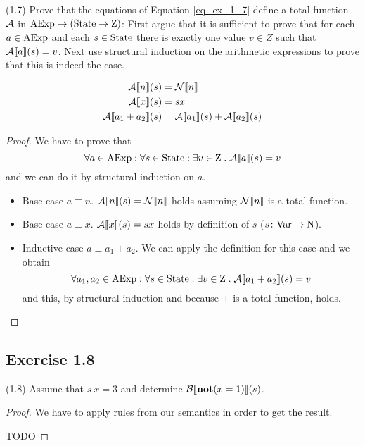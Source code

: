 \documentclass[12pt,a4paper,oneside]{book}
\begin{document}
\begin{exercise}{(1.7)}
	\label{ex_1_7}
	Prove that the equations of Equation \ref{eq_ex_1_7} define a total function $\mathcal{A}$ in $\mathrm{AExp} \to (\mathrm{State} \to \mathrm{Z})$: First argue that it is sufficient to prove that for each $a \in \mathrm{AExp}$ and each $s \in \mathrm{State}$ there is exactly one value $v \in Z$ such that $\mathcal{A} \llbracket a \rrbracket (s) = v$. Next use structural induction on the arithmetic expressions to prove that this is indeed the case.
	
	\begin{equation}
	\label{eq_ex_1_7}
	\begin{split}
	\mathcal{A} \llbracket n \rrbracket (s) &= \mathcal{N} \llbracket n \rrbracket \\
	\mathcal{A} \llbracket x \rrbracket (s) &= s x \\
	\mathcal{A} \llbracket a_1+a_2 \rrbracket (s) &= \mathcal{A} \llbracket a_1 \rrbracket (s) + \mathcal{A} \llbracket a_2 \rrbracket (s) \\
	\end{split}
	\end{equation}
	
	\begin{proof}
		We have to prove that
		\[
		\forall a \in \mathrm{AExp} \mathrel{:} \forall s \in \mathrm{State}: \exists v \in \mathrm{Z} \mathrel{.} \mathcal{A} \llbracket a \rrbracket (s) = v
		\]
		and we can do it by structural induction on $a$.
		
		\begin{itemize}
			\item Base case $a \equiv n$. $\mathcal{A} \llbracket n \rrbracket (s) = \mathcal{N} \llbracket n \rrbracket$ holds assuming $\mathcal{N} \llbracket n \rrbracket$ is a total function.
			\item Base case $a \equiv x$. $\mathcal{A} \llbracket x \rrbracket (s) = s x$ holds by definition of $s$ ($\mathord{s}\colon\mathrm{Var}\to\mathrm{N}$).
			\item Inductive case $a \equiv a_1 + a_2$. We can apply the definition for this case and we obtain
			\[
			\forall a_1, a_2 \in \mathrm{AExp} \mathrel{:} \forall s \in \mathrm{State}: \exists v \in \mathrm{Z} \mathrel{.} \mathcal{A} \llbracket a_1 + a_2 \rrbracket (s) = v
			\]
			and this, by structural induction and because $+$ is a total function, holds.
		\end{itemize}
	\end{proof}
	
\end{exercise}

\subsection{Exercise 1.8}

\begin{exercise}{(1.8)}
	Assume that $s\ x = 3$ and determine $\mathcal{B} \llbracket \mathop{\textbf{\textup{not}}}(x = 1) \rrbracket (s)$.
	
	\begin{proof}
		We have to apply rules from our semantics in order to get the result.
		
		TODO
	\end{proof}
\end{exercise}
\end{document}
